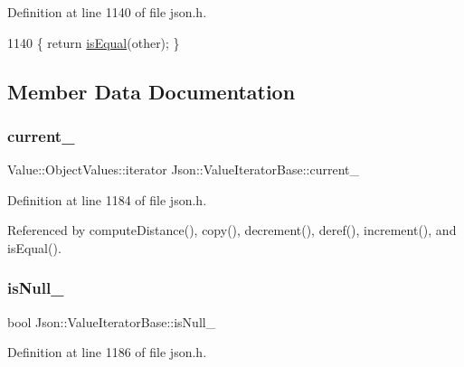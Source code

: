 Definition at line 1140 of file json.\+h.


\begin{DoxyCode}
1140 \{ \textcolor{keywordflow}{return} \hyperlink{class_json_1_1_value_iterator_base_a010b5ad3f3337ae3732e5d7e16ca5e25}{isEqual}(other); \}
\end{DoxyCode}


\subsection{Member Data Documentation}
\mbox{\label{class_json_1_1_value_iterator_base_ab3138ce8af8301cca3b041ea55cb922a}} 
\subsubsection{\texorpdfstring{current\+\_\+}{current\_}}
{\footnotesize\ttfamily Value\+::\+Object\+Values\+::iterator Json\+::\+Value\+Iterator\+Base\+::current\+\_\+\hspace{0.3cm}{\ttfamily [private]}}



Definition at line 1184 of file json.\+h.



Referenced by compute\+Distance(), copy(), decrement(), deref(), increment(), and is\+Equal().

\mbox{\label{class_json_1_1_value_iterator_base_a3e08b114a1aed9bde518c527f94a8c59}} 
\subsubsection{\texorpdfstring{is\+Null\+\_\+}{isNull\_}}
{\footnotesize\ttfamily bool Json\+::\+Value\+Iterator\+Base\+::is\+Null\+\_\+\hspace{0.3cm}{\ttfamily [private]}}



Definition at line 1186 of file json.\+h.



